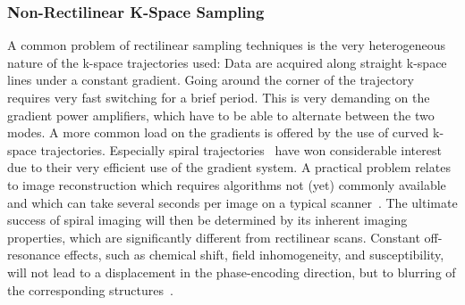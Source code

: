 \documentclass[english,version-2022-01]{uzl-thesis} %
\begin{document}
\subsubsection{Non-Rectilinear K-Space Sampling}
A common problem of rectilinear sampling techniques is the very heterogeneous nature of the k-space trajectories used: Data are acquired along straight k-space lines under a constant gradient. Going around the corner of the trajectory requires very fast switching for a brief period. 
This 
is very demanding on the gradient power amplifiers, which have to be able to alternate between the two modes. A more common load on the gradients is offered by the use of curved k-space trajectories. Especially spiral trajectories~\cite{SpiralMRI, SpiralMRI2} have won considerable interest due to their very efficient use of the gradient system. 
A practical problem relates to image reconstruction which requires algorithms not (yet) commonly available and which can take several seconds per image on a typical scanner~\cite{SamplingStrategies}. 
The ultimate success of spiral imaging will then be determined by its inherent imaging properties, which are significantly different from rectilinear scans. Constant off-resonance effects, such as chemical shift, field inhomogeneity, and susceptibility, will not lead to a displacement in the phase-encoding direction, but to blurring of the corresponding structures~\cite{SamplingStrategies}.
\end{document}

